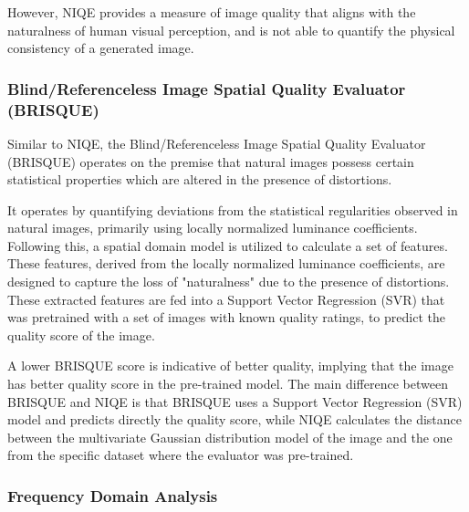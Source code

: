             However, NIQE provides a measure of image quality that aligns with the naturalness of human visual perception, and is not able to quantify the physical consistency of a generated image.

        \subsubsection{Blind/Referenceless Image Spatial Quality Evaluator (BRISQUE)}

            Similar to NIQE, the Blind/Referenceless Image Spatial Quality Evaluator (BRISQUE) \cite{mittal2012} operates on the premise that natural images possess certain statistical properties which are altered in the presence of distortions. 
            
            It operates by quantifying deviations from the statistical regularities observed in natural images, primarily using locally normalized luminance coefficients. 
            Following this, a spatial domain model is utilized to calculate a set of features. 
            These features, derived from the locally normalized luminance coefficients, are designed to capture the loss of "naturalness" due to the presence of distortions.
            These extracted features are fed into a Support Vector Regression (SVR) that was pretrained with a set of images with known quality ratings, to predict the quality score of the image.
            
            A lower BRISQUE score is indicative of better quality, implying that the image has better quality score in the pre-trained model. The main difference between BRISQUE and NIQE is that BRISQUE uses a Support Vector Regression (SVR) model and predicts directly the quality score, while NIQE calculates the distance between the multivariate Gaussian distribution model of the image and the one from the specific dataset where the evaluator was pre-trained.




        \subsubsection{Frequency Domain Analysis} \label{subsubsec:frequency_domain_analysis}
        
